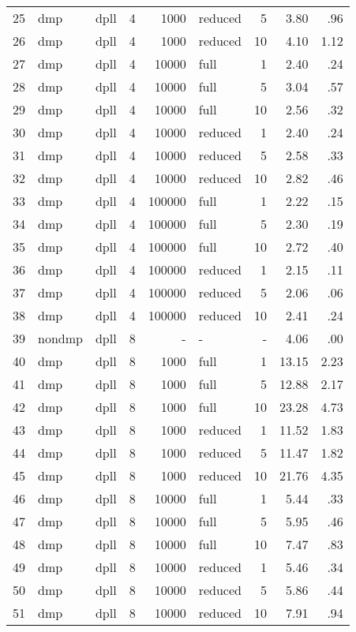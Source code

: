 \begin{center}
\begin{small}
\begin{longtable}{rllrrlrrr}
25 & dmp & dpll & 4 & 1000 & reduced & 5 & 3.80 & .96\\
26 & dmp & dpll & 4 & 1000 & reduced & 10 & 4.10 & 1.12\\
27 & dmp & dpll & 4 & 10000 & full & 1 & 2.40 & .24\\
28 & dmp & dpll & 4 & 10000 & full & 5 & 3.04 & .57\\
29 & dmp & dpll & 4 & 10000 & full & 10 & 2.56 & .32\\
30 & dmp & dpll & 4 & 10000 & reduced & 1 & 2.40 & .24\\
31 & dmp & dpll & 4 & 10000 & reduced & 5 & 2.58 & .33\\
32 & dmp & dpll & 4 & 10000 & reduced & 10 & 2.82 & .46\\
33 & dmp & dpll & 4 & 100000 & full & 1 & 2.22 & .15\\
34 & dmp & dpll & 4 & 100000 & full & 5 & 2.30 & .19\\
35 & dmp & dpll & 4 & 100000 & full & 10 & 2.72 & .40\\
36 & dmp & dpll & 4 & 100000 & reduced & 1 & 2.15 & .11\\
37 & dmp & dpll & 4 & 100000 & reduced & 5 & 2.06 & .06\\
38 & dmp & dpll & 4 & 100000 & reduced & 10 & 2.41 & .24\\
\hline
39 & nondmp & dpll & 8 & - & - & - & 4.06 & .00\\
40 & dmp & dpll & 8 & 1000 & full & 1 & 13.15 & 2.23\\
41 & dmp & dpll & 8 & 1000 & full & 5 & 12.88 & 2.17\\
42 & dmp & dpll & 8 & 1000 & full & 10 & 23.28 & 4.73\\
43 & dmp & dpll & 8 & 1000 & reduced & 1 & 11.52 & 1.83\\
44 & dmp & dpll & 8 & 1000 & reduced & 5 & 11.47 & 1.82\\
45 & dmp & dpll & 8 & 1000 & reduced & 10 & 21.76 & 4.35\\
46 & dmp & dpll & 8 & 10000 & full & 1 & 5.44 & .33\\
47 & dmp & dpll & 8 & 10000 & full & 5 & 5.95 & .46\\
48 & dmp & dpll & 8 & 10000 & full & 10 & 7.47 & .83\\
49 & dmp & dpll & 8 & 10000 & reduced & 1 & 5.46 & .34\\
50 & dmp & dpll & 8 & 10000 & reduced & 5 & 5.86 & .44\\
51 & dmp & dpll & 8 & 10000 & reduced & 10 & 7.91 & .94\\

\end{longtable}
\end{small}
\end{center}
